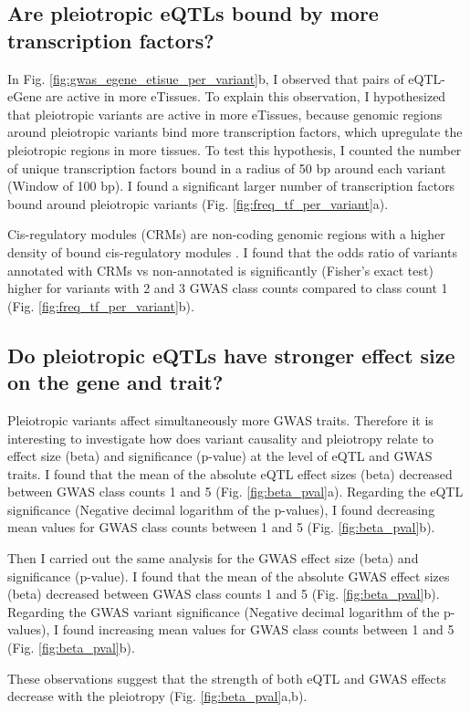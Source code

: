\subsection*{Are pleiotropic eQTLs bound by more transcription factors?}

In Fig. \ref{fig:gwas_egene_etisue_per_variant}b, I observed that pairs of eQTL-eGene are active in more eTissues.
%
To explain this observation, I hypothesized that pleiotropic variants are active in more eTissues, because genomic regions around pleiotropic variants bind more transcription factors, which upregulate the pleiotropic regions in more tissues.
%
To test this hypothesis, I counted the number of unique transcription factors bound in a radius of 50 bp around each variant (Window of 100 bp).
%
I found a significant larger number of transcription factors bound around pleiotropic variants (Fig. \ref{fig:freq_tf_per_variant}a).

Cis-regulatory modules (CRMs) are non-coding genomic regions with a higher density of bound cis-regulatory modules \citep{2021.Ballester.Hammal}.
%
I found that the odds ratio of variants annotated with CRMs vs non-annotated is significantly (Fisher's exact test) higher for variants with 2 and 3 GWAS class counts compared to class count 1 (Fig. \ref{fig:freq_tf_per_variant}b).

\subsection*{Do pleiotropic eQTLs have stronger effect size on the gene and trait?}

Pleiotropic variants affect simultaneously more GWAS traits.
%
Therefore it is interesting to investigate how does variant causality and pleiotropy relate to effect size (beta) and significance (p-value) at the level of eQTL and GWAS traits.
%
I found that the mean of the absolute eQTL effect sizes (beta) decreased between GWAS class counts 1 and 5 (Fig. \ref{fig:beta_pval}a).
%
Regarding the eQTL significance (Negative decimal logarithm of the p-values), I found decreasing mean values for GWAS class counts between 1 and 5 (Fig. \ref{fig:beta_pval}b).

Then I carried out the same analysis for the GWAS effect size (beta) and significance (p-value).
%
I found that the mean of the absolute GWAS effect sizes (beta) decreased between GWAS class counts 1 and 5 (Fig. \ref{fig:beta_pval}b).
%
Regarding the GWAS variant significance (Negative decimal logarithm of the p-values), I found increasing mean values for GWAS class counts between 1 and 5 (Fig. \ref{fig:beta_pval}b).

These observations suggest that the strength of both eQTL and GWAS effects decrease with the pleiotropy (Fig. \ref{fig:beta_pval}a,b).
